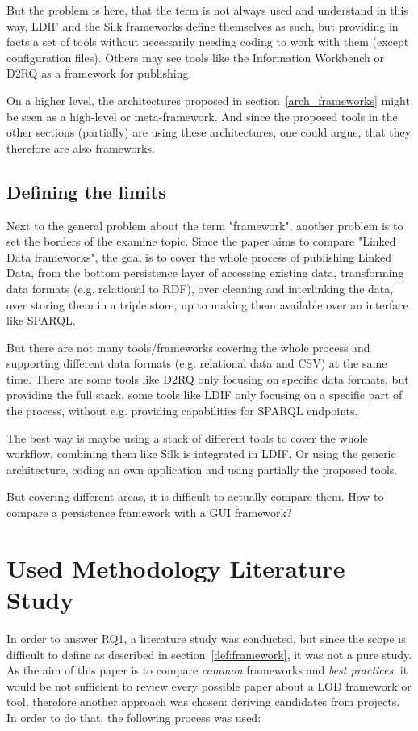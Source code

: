 But the problem is here, that the term is not always used and understand in this way, LDIF and the Silk frameworks define themselves as such, but providing in facts a set of tools without necessarily needing coding to work with them (except configuration files). Others may see tools like the Information Workbench or D2RQ as a framework for publishing.

On a higher level, the architectures proposed in section~\ref{arch_frameworks} might be seen as a high-level or meta-framework. And since the proposed tools in the other sections (partially) are using these architectures, one could argue, that they therefore are also frameworks.

\subsection{Defining the limits}

Next to the general problem about the term "framework", another problem is to set the borders of the examine topic. Since the paper aims to compare "Linked Data frameworks", the goal is to cover the whole process of publishing Linked Data, from the bottom persistence layer of accessing existing data, transforming data formats (e.g. relational to RDF), over cleaning and interlinking the data, over storing them in a triple store, up to making them available over an interface like SPARQL.

But there are not many tools/frameworks covering the whole process and supporting different data formats (e.g. relational data and CSV) at the same time. There are some tools like D2RQ only focusing on specific data formats, but providing the full stack, some tools like LDIF only focusing on a specific part of the process, without e.g. providing capabilities for SPARQL endpoints.

The best way is maybe using a stack of different tools to cover the whole workflow, combining them like Silk is integrated in LDIF. Or using the generic architecture, coding an own application and using partially the proposed tools.

But covering different areas, it is difficult to actually compare them. How to compare a persistence framework with a GUI framework?

\section{Used Methodology Literature Study}
In order to answer RQ1, a literature study was conducted, but since the scope is difficult to define as described in section~\ref{def:framework}, it was not a pure study. As the aim of this paper is to compare \textit{common} frameworks and \textit{best practices}, it would be not sufficient to review every possible paper about a LOD framework or tool, therefore another approach was chosen: deriving candidates from projects. In order to do that, the following process was used:

